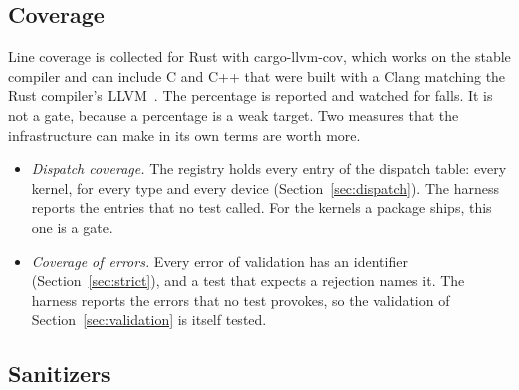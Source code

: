 \documentclass[11pt,a4paper]{article}
\begin{document}
\subsection{Coverage}

Line coverage is collected for Rust with cargo-llvm-cov, which works on the
stable compiler and can include C and C++ that were built with a Clang
matching the Rust compiler's LLVM~\cite{cargollvmcov}.  The percentage is
reported and watched for falls.  It is not a gate, because a percentage is
a weak target.  Two measures that the infrastructure can make in its own
terms are worth more.

\begin{itemize}
  \item \emph{Dispatch coverage.}  The registry holds every entry of the
        dispatch table: every kernel, for every type and every device
        (Section~\ref{sec:dispatch}).  The harness reports the entries that
        no test called.  For the kernels a package ships, this one is a
        gate.
  \item \emph{Coverage of errors.}  Every error of validation has an
        identifier (Section~\ref{sec:strict}), and a test that expects a
        rejection names it.  The harness reports the errors that no test
        provokes, so the validation of Section~\ref{sec:validation} is
        itself tested.
\end{itemize}

\subsection{Sanitizers}
\label{sec:sanitizers}
\end{document}
